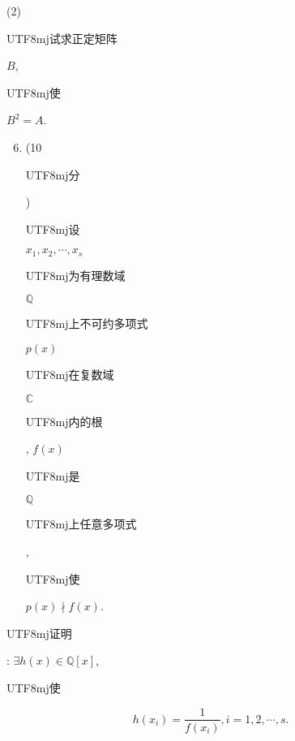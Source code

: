 \documentclass[10pt]{article}
\begin{document}
(2) \begin{CJK}{UTF8}{mj}试求正定矩阵\end{CJK} $B$, \begin{CJK}{UTF8}{mj}使\end{CJK} $B^{2}=A$.

\begin{enumerate}
  \setcounter{enumi}{5}
  \item (10 \begin{CJK}{UTF8}{mj}分\end{CJK}) \begin{CJK}{UTF8}{mj}设\end{CJK} $x_{1}, x_{2}, \cdots, x_{s}$ \begin{CJK}{UTF8}{mj}为有理数域\end{CJK} $\mathbb{Q}$ \begin{CJK}{UTF8}{mj}上不可约多项式\end{CJK} $p(x)$ \begin{CJK}{UTF8}{mj}在复数域\end{CJK} $\mathbb{C}$ \begin{CJK}{UTF8}{mj}内的根\end{CJK}, $f(x)$ \begin{CJK}{UTF8}{mj}是\end{CJK} $\mathbb{Q}$ \begin{CJK}{UTF8}{mj}上任意多项式\end{CJK}, \begin{CJK}{UTF8}{mj}使\end{CJK} $p(x) \nmid f(x)$.
\end{enumerate}
\begin{CJK}{UTF8}{mj}证明\end{CJK}: $\exists h(x) \in \mathbb{Q}[x]$, \begin{CJK}{UTF8}{mj}使\end{CJK}
$$
h\left(x_{i}\right)=\frac{1}{f\left(x_{i}\right)}, i=1,2, \cdots, s .
$$
\end{document}
